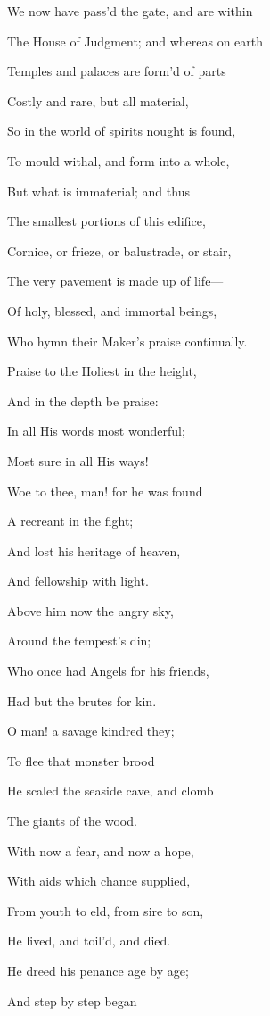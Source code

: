 We now have pass'd the gate, and are within

The House of Judgment; and whereas on earth

Temples and palaces are form'd of parts

Costly and rare, but all material,

So in the world of spirits nought is found,

To mould withal, and form into a whole,

But what is immaterial; and thus

The smallest portions of this edifice,

Cornice, or frieze, or balustrade, or stair,

The very pavement is made up of life—

Of holy, blessed, and immortal beings,

Who hymn their Maker's praise continually.


Praise to
the Holiest in the height,

And in the depth be praise:

In all
His words most wonderful;

Most sure in all His ways! 

Woe to
thee, man! for he was found

A recreant in the fight;

And
lost his heritage of heaven,

And fellowship with light.

Above him
now the angry sky,

Around the tempest's din;

Who
once had Angels for his friends,

Had but the brutes for kin.

O man! a
savage kindred they;

To flee that monster brood

He
scaled the seaside cave, and clomb

The giants of the wood.

With now
a fear, and now a hope,

With aids which chance supplied,

From
youth to eld, from sire to son,

He lived, and toil'd, and died.

He dreed
his penance age by age;

And step by step began


